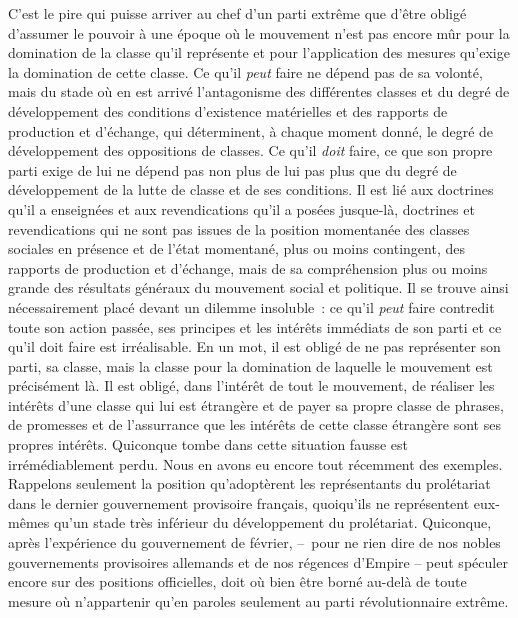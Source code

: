 \documentclass[french,twoside]{book} %
\begin{document}
C’est le pire qui puisse arriver au chef d’un parti extrême que d’être obligé d’assumer le pouvoir à une époque où le mouvement n’est pas encore mûr pour la domination de la classe qu’il représente et pour l’application des mesures qu’exige la domination de cette classe. Ce qu’il \emph{peut} faire ne dépend pas de sa volonté, mais du stade où en est arrivé l’antagonisme des différentes classes et du degré de développement des conditions d’existence matérielles et des rapports de production et d’échange, qui déterminent, à chaque moment donné, le degré de développement des oppositions de classes. Ce qu’il \emph{doit} faire, ce que son propre parti exige de lui ne dépend pas non plus de lui pas plus que du degré de développement de la lutte de classe et de ses conditions. Il est lié aux doctrines qu’il a enseignées et aux revendications qu’il a posées jusque-là, doctrines et revendications qui ne sont pas issues de la position momentanée des classes sociales en présence et de l’état momentané, plus ou moins contingent, des rapports de production et d’échange, mais de sa compréhension plus ou moins grande des résultats généraux du mouvement social et politique. Il se trouve ainsi nécessairement placé devant un dilemme insoluble : ce qu’il \emph{peut} faire contredit toute son action passée, ses principes et les intérêts immédiats de son parti et ce qu’il doit faire est irréalisable. En un mot, il est obligé de ne pas représenter son parti, sa classe, mais la classe pour la domination de laquelle le mouvement est précisément là. Il est obligé, dans l’intérêt de tout le mouvement, de réaliser les intérêts d’une classe qui lui est étrangère et de payer sa propre classe de phrases, de promesses et de l’assurrance que les intérêts de cette classe étrangère sont ses propres intérêts. Quiconque tombe dans cette situation fausse est irrémédiablement perdu. Nous en avons eu encore tout récemment des exemples. Rappelons seulement la position qu’adoptèrent les représentants du prolétariat dans le dernier gouvernement provisoire français, quoiqu’ils ne représentent eux-mêmes qu’un stade très inférieur du développement du prolétariat. Quiconque, après l’expérience du gouvernement de février, – pour ne rien dire de nos nobles gouvernements provisoires allemands et de nos régences d’Empire – peut spéculer encore sur des positions officielles, doit où bien être borné au-delà de toute mesure où n’appartenir qu’en paroles seulement au parti révolutionnaire extrême.\par
\end{document}
